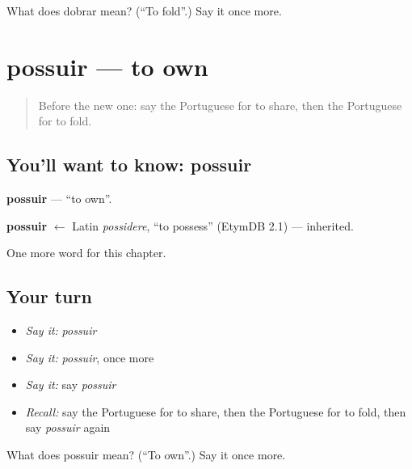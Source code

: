 \begin{tcolorbox}[breakable,colback=teal!4,colframe=teal!35!black,title={Before you move on}]
What does dobrar mean? (\textquotedblleft{}To fold\textquotedblright{}.) Say it once more.
\end{tcolorbox}
\section[possuir]{possuir — to own}

\label{lesson:PT-C235-possuir}



\begin{quote}
Before the new one: say the Portuguese for to share, then the Portuguese for to fold.
\end{quote}

\subsection*{You'll want to know: possuir}
\textbf{possuir} — \textquotedblleft{}to own\textquotedblright{}.

\begin{cousinweb}
\textbf{possuir} $\leftarrow$ Latin \emph{possidere}, \textquotedblleft{}to possess\textquotedblright{} (EtymDB 2.1) — inherited.
\end{cousinweb}

\begin{grammarlens}[title={What you've built}]
One more word for this chapter.
\end{grammarlens}

\subsection*{Your turn}
\begin{itemize}
\raggedright
  \item \emph{Say it:} \emph{possuir}
  \item \emph{Say it:} \emph{possuir}, once more
  \item \emph{Say it:} say \emph{possuir}
  \item \emph{Recall:} say the Portuguese for to share, then the Portuguese for to fold, then say \emph{possuir} again
\end{itemize}

\begin{tcolorbox}[breakable,colback=teal!4,colframe=teal!35!black,title={Before you move on}]
What does possuir mean? (\textquotedblleft{}To own\textquotedblright{}.) Say it once more.
\end{tcolorbox}
